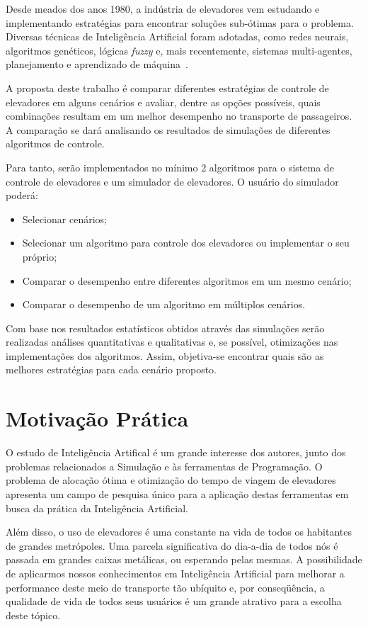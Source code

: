 Desde meados dos anos 1980, a indústria de elevadores vem estudando e implementando estratégias para encontrar soluções sub-ótimas para o problema. Diversas técnicas de Inteligência Artificial foram adotadas, como redes neurais, algoritmos genéticos, lógicas \textit{fuzzy} e, mais recentemente, sistemas multi-agentes, planejamento e aprendizado de máquina~\cite{KOEHLEROTTIGER02}.

A proposta deste trabalho é comparar diferentes estratégias de controle de elevadores em alguns cenários e avaliar, dentre as opções possíveis, quais combinações resultam em um melhor desempenho no transporte de passageiros. A comparação se dará analisando os resultados de simulações de diferentes algoritmos de controle.

Para tanto, serão implementados no mínimo 2 algoritmos para o sistema de controle de elevadores e um simulador de elevadores. O usuário do simulador poderá:

\begin{itemize}
  \item Selecionar cenários;
  \item Selecionar um algoritmo para controle dos elevadores ou implementar o seu próprio;
  \item Comparar o desempenho entre diferentes algoritmos em um mesmo cenário;
  \item Comparar o desempenho de um algoritmo em múltiplos cenários.
\end{itemize}

Com base nos resultados estatísticos obtidos através das simulações serão realizadas análises quantitativas e qualitativas e, se possível, otimizações nas implementações dos algoritmos. Assim, objetiva-se encontrar quais são as melhores estratégias para cada cenário proposto.

\section{Motivação Prática}
O estudo de Inteligência Artifical é um grande interesse dos autores, junto dos
problemas relacionados a Simulação e às ferramentas de Programação. O problema
de alocação ótima e otimização do tempo de viagem de elevadores apresenta um
campo de pesquisa único para a aplicação destas ferramentas em busca da prática
da Inteligência Artificial.

Além disso, o uso de elevadores é uma constante na vida de todos os habitantes
de grandes metrópoles. Uma parcela significativa do dia-a-dia de todos nós é
passada em grandes caixas metálicas, ou esperando pelas mesmas. A possibilidade
de aplicarmos nossos conhecimentos em Inteligência Artificial para melhorar a
performance deste meio de transporte tão ubíquito e, por conseqüência, a
qualidade de vida de todos seus usuários é um grande atrativo para a escolha
deste tópico.

